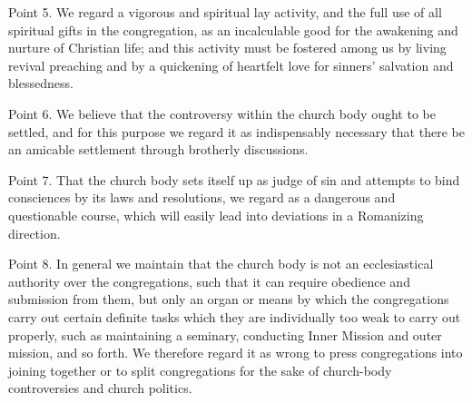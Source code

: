 Point 5. We regard a vigorous and spiritual lay activity, and the full use of all spiritual gifts in the congregation, as an incalculable good for the awakening and nurture of Christian life; and this activity must be fostered among us by living revival preaching and by a quickening of heartfelt love for sinners’ salvation and blessedness.

Point 6. We believe that the controversy within the church body ought to be settled, and for this purpose we regard it as indispensably necessary that there be an amicable settlement through brotherly discussions.

Point 7. That the church body sets itself up as judge of sin and attempts to bind consciences by its laws and resolutions, we regard as a dangerous and questionable course, which will easily lead into deviations in a Romanizing direction.

Point 8. In general we maintain that the church body is not an ecclesiastical authority over the congregations, such that it can require obedience and submission from them, but only an organ or means by which the congregations carry out certain definite tasks which they are individually too weak to carry out properly, such as maintaining a seminary, conducting Inner Mission and outer mission, and so forth. We therefore regard it as wrong to press congregations into joining together or to split congregations for the sake of church-body controversies and church politics.
